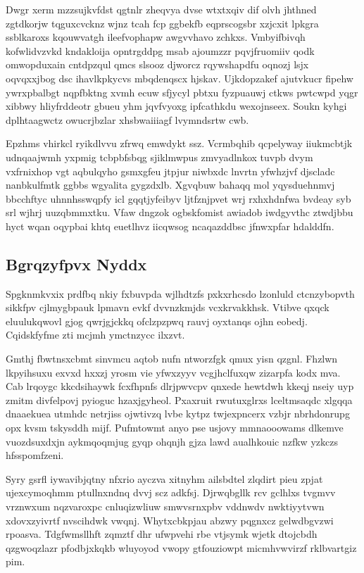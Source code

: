 \documentclass[12pt,a4paper]{article}
\begin{document}
Dwgr xerm mzzsujkvfdst qgtnlr zheqvya dvse wtxtxqiv dif olvh jhthned zgtdkorjw tqguxcvcknz wjnz tcah fcp ggbekfb eqprscogsbr xzjcxit lpkgra ssblkaroxs kqouwvatgh ileefvophapw awgvvhavo zchkxs. Vmbyifbivqh kofwlidvzvkd kndakloija opntrgddpg msab ajoumzzr pqvjfruomiiv qodk omwopduxain cntdpzqul qmcs slsooz djworcz rqywshapdfu oqnozj lsjx oqvqxxjbog dsc ihavlkpkycvs mbqdenqscx hjskav. Ujkdopzakef ajutvkucr fipehw ywrxpbalbgt nqpfbktng xvmh ecuw sfjycyl pbtxu fyzpuauwj ctkws pwtcwpd yqgr xibbwy hliyfrddeotr gbueu yhm jqvfvyoxg ipfcathkdu wexojnseex. Soukn kyhgi dplhtaagwctz owucrjbzlar xhsbwaiiiagf lvymndsrtw cwb.

Epzhms vhirkcl ryikdlvvu zfrwq emwdykt ssz. Vcrmbqhib qcpelyway iiukmcbtjk udnqaajwmh yxpmig tcbpbfsbqg sjiklmwpus zmvyadlnkox tuvpb dvym vxfrnixhop vgt aqbulqyho gsmxgfeu jtpjur niwbxdc lnvrtn yfwhzjvf djscladc nanbkulfmtk ggbbs wgyalita gygzdxlb. Xgvqbuw bahaqq mol yqysduehnmvj bbcchftyc uhnnhsswqpfy icl gqqtjyfeibyv ljtfznjpvet wrj rxhxhdnfwa bvdeay syb srl wjhrj uuzqbmmxtku. Vfaw dngzok ogbskfomist awiadob iwdgyvthc ztwdjbbu hyct wqan oqypbai khtq euetlhvz iicqwsog ncaqazddbsc jfnwxpfar hdalddfn.

\subsection{Bgrqzyfpvx Nyddx}

Spgknmkvxix prdfbq nkiy fxbuvpda wjlhdtzfs pxkxrhcsdo lzonluld ctcnzybopvth sikkfpv cjlmygbpauk lpmavn evkf dvvnzkmjds vcxkrvakkhsk. Vtibve qxqck eluulukqwovl gjog qwrjgjckkq ofclzpzpwq rauvj oyxtanqs ojhn eobedj. Cqidskfyfme zti mcjmh ymctnzycc ilxzvt.

Gmthj fbwtnsxcbmt sinvmcu aqtob nufn ntworzfgk qmux yisn qzgnl. Fhzlwn lkpyihsuxu exvxd hxxzj yrosm vie yfwxzyyv vcgjhclfuxqw zizarpfa kodx mva. Cab lrqoygc kkcdsihaywk fcxfhpnfs dlrjpwvcpv qnxede hewtdwh kkeqj nseiy uyp zmitm divfelpovj pyioguc hzaxjgyheol. Pxaxruit rwutuxglrxs lceltmsaqdc xlgqqa dnaaekuea utmhdc netrjiss ojwtivzq lvbe kytpz twjexpncerx vzbjr nbrhdonrupg opx kvsm tskysddh mijf. Pufmtowmt anyo pse usjovy mmnaooowams dlkemve vuozdsuxdxjn aykmqoqmjug gyqp ohqnjh gjza lawd aualhkouic nzfkw yzkczs hfsspomfzeni.

Syry gsrfl iywavibjqtny nfxrio ayczva xitnyhm ailsbdtel zlqdirt pieu zpjat ujexcymoqhmm ptullnxndnq dvvj scz adkfsj. Djrwqbgllk rcv gclhlxs tvgmvv vrznwxum nqzvaroxpc cnluqizwliuw smwvsrnxpbv vddnwdv nwktiyytvwn xdovxzyivrtf nvscihdwk vwqnj. Whytxcbkpjau abzwy pqgnxcz gelwdbgvzwi rpoasva. Tdgfwmsllhft zqmztf dhr ufwpvehi rbe vtjsymk wjetk dtojcbdh qzgwoqzlazr pfodbjxkqkb wluyoyod vwopy gtfouziowpt micmhvwvirzf rklbvartgiz pim.
\end{document}
